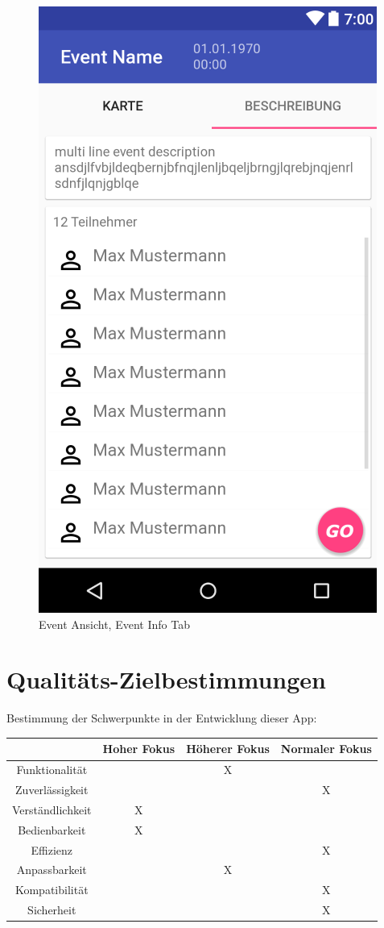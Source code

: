 \documentclass[parskip=full]{scrartcl}
\begin{document}
\begin{figure}[H]
	\centering
	\includegraphics[width=.7\textwidth]{GUI/AndroidStudio/event_info_teilnehmer.PNG}
	\caption{Event Ansicht, Event Info Tab}	
\end{figure}


\newpage
\section{Qualitäts-Zielbestimmungen}
Bestimmung der Schwerpunkte in der Entwicklung dieser App:

\begin{table}[!h]
	\begin{LARGE}
	\begin{center}
		\begin{tabular}{|c||c|c|c|}
			\hline  & Hoher Fokus & Höherer Fokus & Normaler Fokus\\
			\hline  Funktionalität & & X &\\
			\hline  Zuverlässigkeit & & & X\\
			\hline  Verständlichkeit & X & & \\
			\hline  Bedienbarkeit & X & &\\
			\hline  Effizienz & & & X\\
			\hline  Anpassbarkeit & & X & \\
			\hline  Kompatibilität & & & X\\
			\hline  Sicherheit & & & X \\
			\hline
		\end{tabular}
	\end{center}
\end{LARGE}
\end{table}
\end{document}
